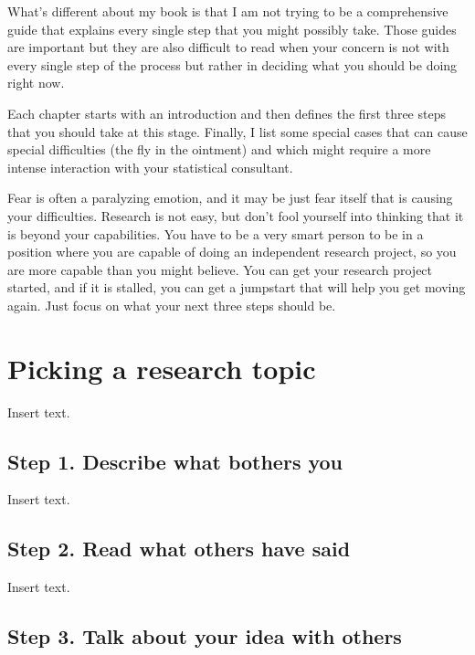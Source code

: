 \documentclass[
  letterpaper,
  DIV=11,
  numbers=noendperiod]{scrreprt}
\begin{document}
What's different about my book is that I am not trying to be a
comprehensive guide that explains every single step that you might
possibly take. Those guides are important but they are also difficult to
read when your concern is not with every single step of the process but
rather in deciding what you should be doing right now.

Each chapter starts with an introduction and then defines the first
three steps that you should take at this stage. Finally, I list some
special cases that can cause special difficulties (the fly in the
ointment) and which might require a more intense interaction with your
statistical consultant.

Fear is often a paralyzing emotion, and it may be just fear itself that
is causing your difficulties. Research is not easy, but don't fool
yourself into thinking that it is beyond your capabilities. You have to
be a very smart person to be in a position where you are capable of
doing an independent research project, so you are more capable than you
might believe. You can get your research project started, and if it is
stalled, you can get a jumpstart that will help you get moving again.
Just focus on what your next three steps should be.


\chapter{Picking a research topic}\label{picking-a-research-topic}

Insert text.

\section{Step 1. Describe what bothers
you}\label{step-1.-describe-what-bothers-you}

Insert text.

\section{Step 2. Read what others have
said}\label{step-2.-read-what-others-have-said}

Insert text.

\section{Step 3. Talk about your idea with
others}\label{step-3.-talk-about-your-idea-with-others}
\end{document}
